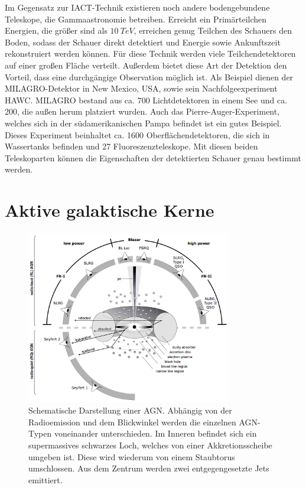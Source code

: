 Im Gegensatz zur IACT-Technik existieren noch andere bodengebundene Teleskope, die Gammaastronomie betreiben.
Erreicht ein Primärteilchen Energien, die größer sind als $\SI{10}{TeV}$, erreichen genug Teilchen des Schauers den Boden, sodass der Schauer direkt detektiert und Energie sowie Ankunftszeit rekonstruiert werden können.
Für diese Technik werden viele Teilchendetektoren auf einer großen Fläche verteilt.
Außerdem bietet diese Art der Detektion den Vorteil, dass eine durchgängige Observation möglich ist.
Als Beispiel dienen der MILAGRO-Detektor\cite{MILAGRO} in New Mexico, USA, sowie sein Nachfolgeexperiment HAWC\cite{HAWC}.
MILAGRO bestand aus ca. 700 Lichtdetektoren in einem See und ca. 200, die außen herum platziert wurden.
Auch das Pierre-Auger-Experiment\cite{AUGER}, welches sich in der südamerikanischen Pampa befindet ist ein gutes Beispiel.
Dieses Experiment beinhaltet ca. 1600 Oberflächendetektoren, die sich in Wassertanks befinden und 27 Fluoreszenzteleskope.
Mit diesen beiden Teleskoparten können die Eigenschaften der detektierten Schauer genau bestimmt werden.



\section{Aktive galaktische Kerne}
\label{sec:AGN}

\begin{figure}
    \centering
    \includegraphics[width=0.8\textwidth]{./Plots/02_Astroteilchenphysik/AGN_Schema.png}
    \caption{Schematische Darstellung einer AGN. Abhängig von der Radioemission und dem Blickwinkel werden die einzelnen AGN-Typen voneinander unterschieden.
    Im Inneren befindet sich ein supermassives schwarzes Loch, welches von einer Akkretionsscheibe umgeben ist. 
    Diese wird wiederum von einem Staubtorus umschlossen.
    Aus dem Zentrum werden zwei entgegengesetzte Jets emittiert.\cite{AGNSchema}}
    \label{AGN_Bild}
\end{figure}

